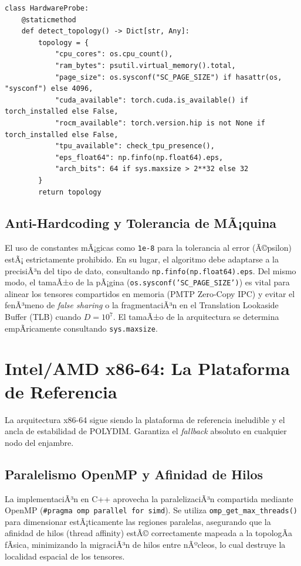 \begin{verbatim}
class HardwareProbe:
    @staticmethod
    def detect_topology() -> Dict[str, Any]:
        topology = {
            "cpu_cores": os.cpu_count(),
            "ram_bytes": psutil.virtual_memory().total,
            "page_size": os.sysconf("SC_PAGE_SIZE") if hasattr(os, "sysconf") else 4096,
            "cuda_available": torch.cuda.is_available() if torch_installed else False,
            "rocm_available": torch.version.hip is not None if torch_installed else False,
            "tpu_available": check_tpu_presence(),
            "eps_float64": np.finfo(np.float64).eps,
            "arch_bits": 64 if sys.maxsize > 2**32 else 32
        }
        return topology
\end{verbatim}

\subsection{Anti-Hardcoding y Tolerancia de MÃ¡quina}
El uso de constantes mÃ¡gicas como \texttt{1e-8} para la tolerancia al error (Ã©psilon) estÃ¡ estrictamente prohibido. En su lugar, el algoritmo debe adaptarse a la precisiÃ³n del tipo de dato, consultando \texttt{np.finfo(np.float64).eps}. Del mismo modo, el tamaÃ±o de la pÃ¡gina (\texttt{os.sysconf('SC\_PAGE\_SIZE')}) es vital para alinear los tensores compartidos en memoria (PMTP Zero-Copy IPC) y evitar el fenÃ³meno de \textit{false sharing} o la fragmentaciÃ³n en el Translation Lookaside Buffer (TLB) cuando \(D = 10^7\). El tamaÃ±o de la arquitectura se determina empÃ­ricamente consultando \texttt{sys.maxsize}.

\section{Intel/AMD x86-64: La Plataforma de Referencia}


La arquitectura x86-64 sigue siendo la plataforma de referencia ineludible y el ancla de estabilidad de POLYDIM. Garantiza el \textit{fallback} absoluto en cualquier nodo del enjambre.

\subsection{Paralelismo OpenMP y Afinidad de Hilos}
La implementaciÃ³n en C++ aprovecha la paralelizaciÃ³n compartida mediante OpenMP (\texttt{\#pragma omp parallel for simd}). Se utiliza \texttt{omp\_get\_max\_threads()} para dimensionar estÃ¡ticamente las regiones paralelas, asegurando que la afinidad de hilos (thread affinity) estÃ© correctamente mapeada a la topologÃ­a fÃ­sica, minimizando la migraciÃ³n de hilos entre nÃºcleos, lo cual destruye la localidad espacial de los tensores.

